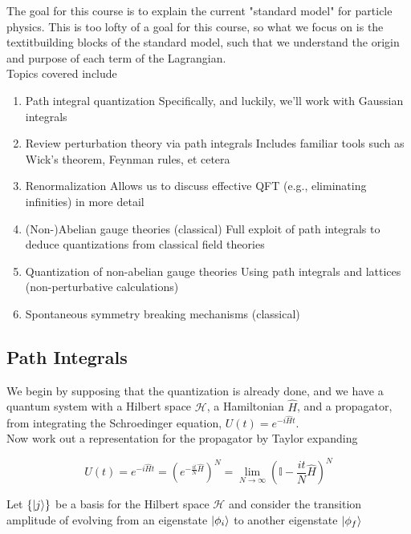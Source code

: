 \noindent The goal for this course is to explain the current "standard model" for particle physics. This is too lofty of a goal for this course, so what we focus on is the textit{building blocks} of the standard model, such that we understand the origin and purpose of each term of the Lagrangian. \\

\noindent Topics covered include

\begin{enumerate}
\item Path integral quantization
	\subitem Specifically, and luckily, we'll work with Gaussian integrals
\item Review perturbation theory via path integrals
	\subitem Includes familiar tools such as Wick's theorem, Feynman rules, et cetera
\item Renormalization
	\subitem Allows us to discuss effective QFT (e.g., eliminating infinities) in more detail
\item (Non-)Abelian gauge theories (classical)
	\subitem Full exploit of path integrals to deduce quantizations from classical field theories
\item Quantization of non-abelian gauge theories
	\subitem Using path integrals and lattices (non-perturbative calculations)
\item Spontaneous symmetry breaking mechanisms (classical)
	\subitem
\end{enumerate}

\subsection*{Path Integrals}

\noindent We begin by supposing that the quantization is already done, and we have a quantum system with a Hilbert space $\mathcal{H}$, a Hamiltonian $\hat{H}$, and a propagator, from integrating the Schroedinger equation, $U(t) = e^{-i\hat{H}t}$. \\

\noindent Now work out a representation for the propagator by Taylor expanding

\begin{equation}
U(t) = e^{-i\hat{H}t} = \left( e^{-\frac{it}{N}\hat{H}}  \right) ^N= \lim_{N \rightarrow \infty} \left( \mathbb{I} - \frac{it}{N}\hat{H} \right) ^N
\end{equation}

\noindent Let $\{ \ket{j} \}$ be a basis for the Hilbert space $\mathcal{H}$ and consider the transition amplitude of evolving from an eigenstate $\ket{\phi_i}$ to another eigenstate $\ket{\phi_f}$

